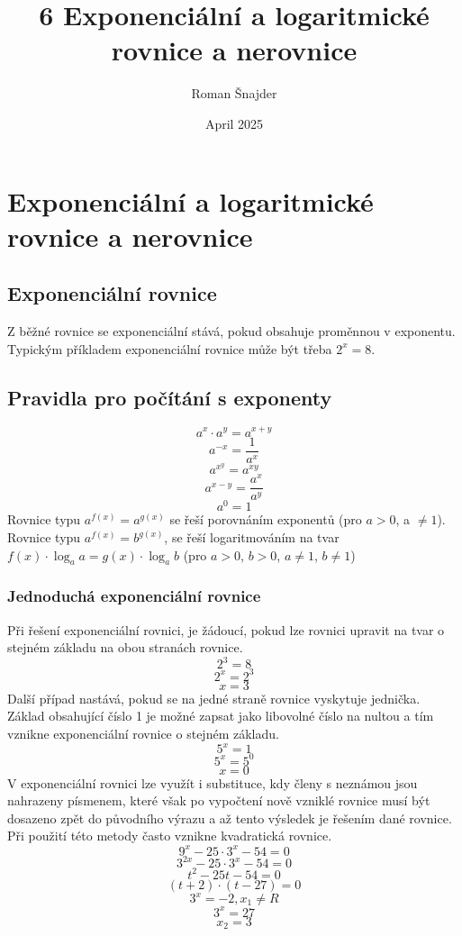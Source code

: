 \title{6 Exponenciální a logaritmické rovnice a nerovnice}
\author{Roman Šnajder}
\date{April 2025}

\maketitle

\section{Exponenciální a logaritmické rovnice a nerovnice}
\subsection {Exponenciální rovnice}

Z běžné rovnice se exponenciální stává, pokud obsahuje proměnnou v exponentu. Typickým příkladem exponenciální rovnice může být třeba $2^x = 8$.
\subsection {Pravidla pro počítání s exponenty}
$$a^x\cdot a^y=a^{x+y}$$
$$a^{-x}=\frac{1}{a^x}$$
$$a^{x^{y}}=a^{xy}$$
$$a^{x-y}=\frac{a^x}{a^y}$$
$$a^0=1$$
Rovnice typu $a^{f(x)}=a^{g(x)}$ se řeší porovnáním exponentů (pro $a>0$, a $\neq 1$). Rovnice typu $a^{f(x)}=b^{g(x)}$, se řeší logaritmováním na tvar $f(x)\cdot\log_a a=g(x)\cdot\log_a b$ (pro $a>0$, $b>0$, $a\neq1$, $b\neq1$)
\subsubsection{Jednoduchá exponenciální rovnice}
Při řešení exponenciální rovnici, je žádoucí, pokud lze rovnici upravit na tvar o stejném základu na obou stranách rovnice.
$$2^3=8$$
$$2^x=2^3$$
$$x=3$$
Další případ nastává, pokud se na jedné straně rovnice vyskytuje jednička. Základ obsahující číslo 1 je možné zapsat jako libovolné číslo na nultou a tím vznikne exponenciální rovnice o stejném základu.
$$5^x=1$$
$$5^x=5^0$$
$$x=0$$
V exponenciální rovnici lze využít i substituce, kdy členy s neznámou jsou nahrazeny písmenem, které však po vypočtení nově vzniklé rovnice musí být dosazeno zpět do původního výrazu a až tento výsledek je řešením dané rovnice. Při použití této metody často vznikne kvadratická rovnice.
$$9^x-25\cdot3^x-54=0$$
$$3^{2x}-25\cdot3^x-54=0$$
$$t^2-25t-54=0$$
$$(t+2)\cdot(t-27)=0$$
$$3^x=-2,x_1\neq R$$
$$3^x=27$$
$$x_2=3$$
